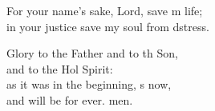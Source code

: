 \begin{psalmverse}
\begin{patverse}
    For your name’s sake, Lord, save m life;\Med\\
    in your justice save my soul from d\pointup{\i}stress.

    Glory to the Father and to th Son,\Med\\
    and to the Hol Spirit:\\
    as it was in the beginning, \pointup{\i}s now,\Med\\
    and will be for ever. men.
  \end{patverse}
  \end{psalmverse}
